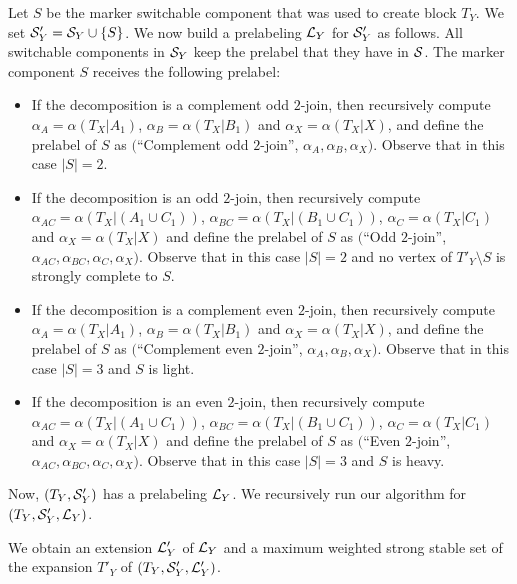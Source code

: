 \documentclass[11 pt] {article}
\begin{document}
Let $S$ be the marker switchable component that was used to create
block $T_Y$.  We set ${\cal S}'_Y = {\cal S}_Y \cup \{S\}$.  We now
build a prelabeling ${\cal L}_Y$ for ${\cal S}'_Y$ as follows.  All
switchable components in ${\cal S}_Y$ keep the prelabel that they have
in $\cal S$.  The marker component $S$ receives the following
prelabel:
\begin{itemize}
\item If the decomposition is a complement odd $2$-join, then
  recursively compute
  $\alpha_A = \alpha(T_X|A_1)$, $\alpha_B = \alpha(T_X|B_1)$ and
  $\alpha_X = \alpha(T_X|X)$, and define the prelabel of $S$ as
  $($``Complement odd $2$-join'', $\alpha_A, \alpha_B, \alpha_X)$.
  Observe that in this case $|S|=2$.

\item If the decomposition is an odd $2$-join, then recursively compute $\alpha_{AC}
  = \alpha(T_X|({A_1 \cup C_1}))$, $\alpha_{BC} = \alpha(T_X|(B_1
  \cup C_1))$, $\alpha_{C}= \alpha(T_X|C_1)$ and $\alpha_{X} =
  \alpha(T_X|X)$ and define the prelabel of $S$ as $($``Odd $2$-join'',
  $\alpha_{AC}, \alpha_{BC}, \alpha_C, \alpha_X)$. Observe that in
  this case $|S|=2$ 
  and no vertex of $T'_Y \setminus S$ is strongly complete to $S$.


\item If the decomposition is a complement even $2$-join, then
  recursively compute
  $\alpha_A = \alpha(T_X|A_1)$, $\alpha_B = \alpha(T_X|B_1)$ and
  $\alpha_X = \alpha(T_X|X)$, and define the prelabel of $S$ as
  $($``Complement even $2$-join'', $\alpha_A, \alpha_B, \alpha_X)$.  
  Observe that in  this case $|S|=3$ and $S$ is light.

\item If the decomposition is an even $2$-join, then recursively compute
  $\alpha_{AC} = \alpha(T_X|({A_1 \cup C_1}))$, $\alpha_{BC} =
  \alpha(T_X|(B_1 \cup C_1))$, $\alpha_{C}= \alpha(T_X|C_1)$ and
  $\alpha_{X} = \alpha(T_X|X)$ and define the prelabel of $S$ as
  $($``Even $2$-join'', $\alpha_{AC}, \alpha_{BC}, \alpha_C, \alpha_X)$.
 Observe that in  this case $|S|=3$ and $S$ is heavy.

\end{itemize}

Now, $(T_Y, {\cal S}'_Y)$ has a prelabeling ${\cal L}_Y$.  We
recursively run our algorithm for $(T_Y, {\cal S}'_Y, {\cal L}_Y)$.

We obtain an extension ${\cal L}'_Y$ of ${\cal L}_Y$ and a maximum
weighted strong stable set of the expansion $T'_Y$ of $(T_Y, {\cal S}'_Y,
{\cal L}'_Y)$.
\end{document}
